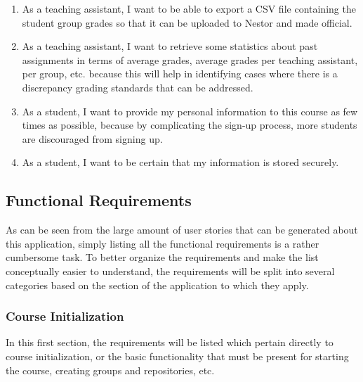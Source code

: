 \documentclass{article}
\begin{document}
\begin{enumerate}
				\item As a teaching assistant, I want to be able to export a CSV file containing the student group grades so that it can be uploaded to Nestor and made official.
				
				\item As a teaching assistant, I want to retrieve some statistics about past assignments in terms of average grades, average grades per teaching assistant, per group, etc. because this will help in identifying cases where there is a discrepancy grading standards that can be addressed.
				
				\item As a student, I want to provide my personal information to this course as few times as possible, because by complicating the sign-up process, more students are discouraged from signing up.
				
				\item As a student, I want to be certain that my information is stored securely.
			\end{enumerate}
	
	\subsection{Functional Requirements}
		As can be seen from the large amount of user stories that can be generated about this application, simply listing all the functional requirements is a rather cumbersome task. To better organize the requirements and make the list conceptually easier to understand, the requirements will be split into several categories based on the section of the application to which they apply.
		
		\subsubsection{Course Initialization}
			In this first section, the requirements will be listed which pertain directly to course initialization, or the basic functionality that must be present for starting the course, creating groups and repositories, etc.
			
\end{document}
